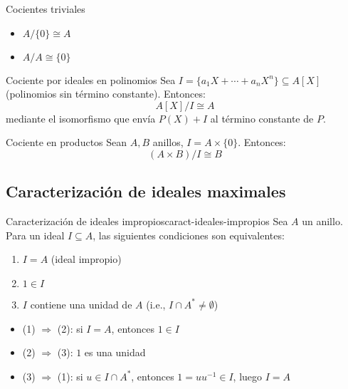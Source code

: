 \begin{example}{Cocientes triviales}{}
    \begin{itemize}
        \item \(A/\{0\} \cong A\)
        \item \(A/A \cong \{0\}\)
    \end{itemize}
\end{example}

\begin{example}{Cociente por ideales en polinomios}{}
    Sea \(I = \{a_1X + \cdots + a_nX^n\} \subseteq A[X]\) (polinomios sin término constante). Entonces:
    \[
    A[X]/I \cong A
    \]
    mediante el isomorfismo que envía \(P(X) + I\) al término constante de \(P\).
\end{example}

\begin{example}{Cociente en productos}{}
    Sean \(A, B\) anillos, \(I = A \times \{0\}\). Entonces:
    \[
    (A \times B)/I \cong B
    \]
\end{example}

\subsection{Caracterización de ideales maximales}

\begin{lemma}{Caracterización de ideales impropios}{caract-ideales-impropios}
    Sea \(A\) un anillo. Para un ideal \(I \subseteq A\), las siguientes condiciones son equivalentes:
    \begin{enumerate}
        \item \(I = A\) (ideal impropio)
        \item \(1 \in I\)
        \item \(I\) contiene una unidad de \(A\) (i.e., \(I \cap A^* \neq \emptyset\))
    \end{enumerate}
\end{lemma}

\begin{proofbox}
    \begin{itemize}
        \item (1) \(\Rightarrow\) (2): si \(I = A\), entonces \(1 \in I\)
        \item (2) \(\Rightarrow\) (3): \(1\) es una unidad
        \item (3) \(\Rightarrow\) (1): si \(u \in I \cap A^*\), entonces \(1 = uu^{-1} \in I\), luego \(I = A\)
    \end{itemize}
\end{proofbox}

